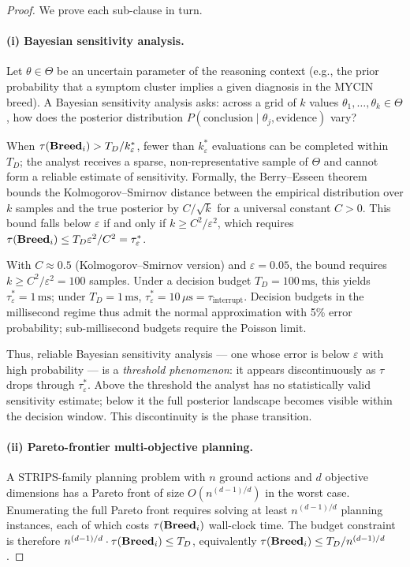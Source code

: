 \begin{proof}
We prove each sub-clause in turn.

\paragraph{(i) Bayesian sensitivity analysis.}
Let $\theta \in \Theta$ be an uncertain parameter of the reasoning context (e.g., the
prior probability that a symptom cluster implies a given diagnosis in the MYCIN breed).
A Bayesian sensitivity analysis asks: across a grid of $k$ values
$\theta_1, \ldots, \theta_k \in \Theta$, how does the posterior distribution
$P(\text{conclusion} \mid \theta_j, \text{evidence})$ vary?

When $\tau(\mathbf{Breed}_i) > T_D / k^*_\varepsilon$, fewer than $k^*_\varepsilon$ evaluations
can be completed within $T_D$; the analyst receives a sparse, non-representative sample
of $\Theta$ and cannot form a reliable estimate of sensitivity.  Formally, the
Berry--Esseen theorem \cite{berry1941,feller1968} bounds the Kolmogorov--Smirnov
distance between the empirical distribution over $k$ samples and the true posterior by
$C / \sqrt{k}$ for a universal constant $C > 0$.  This bound falls below $\varepsilon$ if and only if $k \geq C^2 / \varepsilon^2$,
which requires $\tau(\mathbf{Breed}_i) \leq T_D \varepsilon^2 / C^2 = \tau^*_\varepsilon$.

\begin{remark}
With $C \approx 0.5$ (Kolmogorov--Smirnov version) and $\varepsilon = 0.05$, the bound requires $k \geq C^2/\varepsilon^2 = 100$ samples. Under a decision budget $T_D = 100\,\text{ms}$, this yields $\tau^*_\varepsilon = 1\,\text{ms}$; under $T_D = 1\,\text{ms}$, $\tau^*_\varepsilon = 10\,\mu\text{s} = \tau_{\text{interrupt}}$. Decision budgets in the millisecond regime thus admit the normal approximation with 5\% error probability; sub-millisecond budgets require the Poisson limit.
\end{remark}

Thus, reliable Bayesian sensitivity analysis --- one whose error is below $\varepsilon$
with high probability --- is a \emph{threshold phenomenon}: it appears discontinuously as
$\tau$ drops through $\tau^*_\varepsilon$.  Above the threshold the analyst has no
statistically valid sensitivity estimate; below it the full posterior landscape becomes
visible within the decision window.  This discontinuity is the phase transition.

\paragraph{(ii) Pareto-frontier multi-objective planning.}
A STRIPS-family planning problem with $n$ ground actions and $d$ objective dimensions
has a Pareto front of size $O(n^{(d-1)/d})$ in the worst case.  Enumerating the full
Pareto front requires solving at least $n^{(d-1)/d}$ planning instances, each of which
costs $\tau(\mathbf{Breed}_i)$ wall-clock time.  The budget constraint is therefore
$n^{(d-1)/d} \cdot \tau(\mathbf{Breed}_i) \leq T_D$, equivalently
$\tau(\mathbf{Breed}_i) \leq T_D / n^{(d-1)/d}$.


\end{proof}
